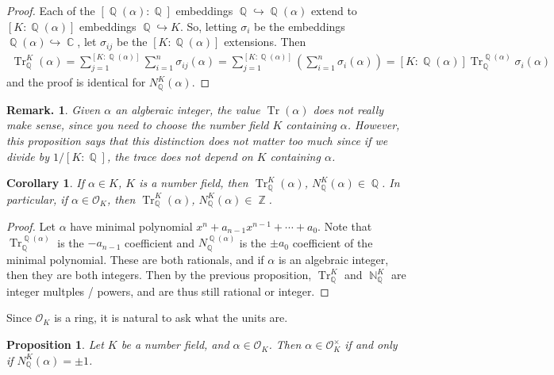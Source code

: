 \documentclass[11pt, a4paper]{memoir}
\DeclareMathOperator{\N}{{\mathbb{N}}}
\DeclareMathOperator{\Q}{{\mathbb{Q}}}
\DeclareMathOperator{\Z}{{\mathbb{Z}}}
\DeclareMathOperator{\C}{{\mathbb{C}}}
\theoremstyle{change}
\newtheorem{corollary}[theorem]{Corollary}
\newtheorem{proposition}[theorem]{Proposition}
\theoremstyle{plain}
\theoremstyle{nonumberplain}
\newtheorem{remark}{Remark.}
\newtheorem{proof}{Proof}
\DeclareMathOperator{\Tr}{Tr}
\begin{document}
\begin{proof}
    Each of the $[\Q(\alpha):\Q]$ embeddings $\Q\hookrightarrow\Q(\alpha)$ extend to $[K:\Q(\alpha)]$ embeddings $\Q\hookrightarrow K$.
    So, letting $\sigma_i$ be the embeddings $\Q(\alpha)\hookrightarrow\C$, let $\sigma_{ij}$ be the $[K:\Q(\alpha)]$ extensions.
    Then
    \begin{align*}
        \Tr_{\Q}^K(\alpha) = \sum_{j=1}^{[K:\Q(\alpha)]}\sum_{i=1}^n\sigma_{ij}(\alpha)= \sum_{j=1}^{[K:\Q(\alpha)]}\left(\sum_{i=1}^n\sigma_{i}(\alpha)\right)=[K:\Q(\alpha)]\Tr_{\Q}^{\Q(\alpha)}\sigma_i(\alpha)
    \end{align*}
    and the proof is identical for $N_{\Q}^K(\alpha)$.
\end{proof}
\begin{remark}
    Given $\alpha$ an algberaic integer, the value $\Tr(\alpha)$ does not really make sense, since you need to choose the number field $K$ containing $\alpha$.
    However, this proposition says that this distinction does not matter too much since if we divide by $1/[K:\Q]$, the trace does not depend on $K$ containing $\alpha$.
\end{remark}
\begin{corollary}
    If $\alpha\in K$, $K$ is a number field, then $\Tr_{\Q}^K(\alpha)$, $N_{\Q}^K(\alpha)\in\Q$.
    In particular, if $\alpha\in\mathcal{O}_K$, then $\Tr_{\Q}^K(\alpha)$, $N_{\Q}^K(\alpha)\in\Z$.
\end{corollary}
\begin{proof}
    Let $\alpha$ have minimal polynomial $x^n+a_{n-1}x^{n-1}+\cdots+a_0$.
    Note that $\Tr_{\Q}^{\Q(\alpha)}$ is the $-a_{n-1}$ coefficient and $N_{\Q}^{\Q(\alpha)}$ is the $\pm a_0$ coefficient of the minimal polynomial.
    These are both rationals, and if $\alpha$ is an algebraic integer, then they are both integers.
    Then by the previous proposition, $\Tr_{\Q}^K$ and $\N_{\Q}^K$ are integer multples / powers, and are thus still rational or integer.
\end{proof}
Since $\mathcal{O}_K$ is a ring, it is natural to ask what the units are.
\begin{proposition}
    Let $K$ be a number field, and $\alpha\in\mathcal{O}_K$.
    Then $\alpha\in\mathcal{O}_K^\times$ if and only if $N_{\Q}^K(\alpha)=\pm 1$.
\end{proposition}
\end{document}
